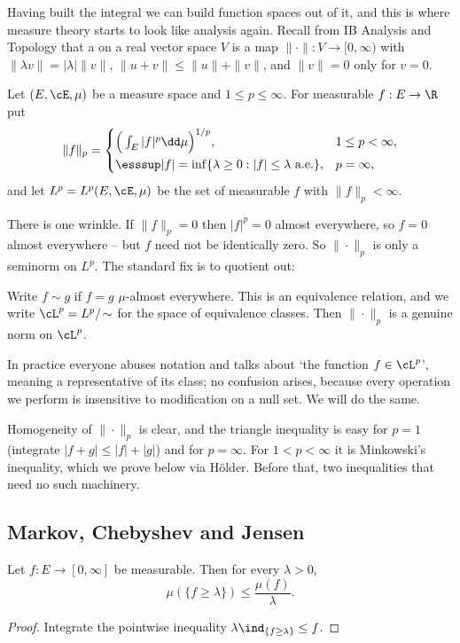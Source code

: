 Having built the integral we can build function spaces out of it, and this is where measure theory starts to look like analysis again. Recall from IB Analysis and Topology that a  on a real vector space $V$ is a map $\|\cdot\| : V \to [0,\infty)$ with $\|\lambda v\| = |\lambda|\|v\|$, $\|u+v\|\leq\|u\|+\|v\|$, and $\|v\|=0$ only for $v=0$.

\begin{definition}[$L^p$ spaces]
	Let $(E,\cE,\mu)$ be a measure space and $1 \leq p \leq \infty$. For measurable $f : E \to \R$ put
	$$
	\|f\|_p = \begin{cases}
		\Big( \int_E |f|^p \dd\mu\Big)^{1/p}, & 1 \leq p < \infty,\\[4pt]
		\esssup |f| = \inf\{\lambda \geq 0 : |f| \leq \lambda \text{ a.e.}\}, & p = \infty,
	\end{cases}
	$$
	and let $L^p = L^p(E,\cE,\mu)$ be the set of measurable $f$ with $\|f\|_p < \infty$.
\end{definition}

There is one wrinkle. If $\|f\|_p = 0$ then $|f|^p = 0$ almost everywhere, so $f = 0$ almost everywhere -- but $f$ need not be identically zero. So $\|\cdot\|_p$ is only a seminorm on $L^p$. The standard fix is to quotient out:

\begin{definition}
	Write $f \sim g$ if $f = g$ $\mu$-almost everywhere. This is an equivalence relation, and we write $\cL^p = L^p/\!\sim$ for the space of equivalence classes. Then $\|\cdot\|_p$ is a genuine norm on $\cL^p$.
\end{definition}

In practice everyone abuses notation and talks about `the function $f \in \cL^p$', meaning a representative of its class; no confusion arises, because every operation we perform is insensitive to modification on a null set. We will do the same.

Homogeneity of $\|\cdot\|_p$ is clear, and the triangle inequality is easy for $p=1$ (integrate $|f+g|\leq|f|+|g|$) and for $p=\infty$. For $1<p<\infty$ it is Minkowski's inequality, which we prove below via H\"older. Before that, two inequalities that need no such machinery.

\subsection{Markov, Chebyshev and Jensen}

\begin{proposition}\label{prop:markov}
	Let $f : E \to[0,\infty]$ be measurable. Then for every $\lambda>0$,
	$$
	\mu(\{f \geq \lambda\}) \leq \frac{\mu(f)}{\lambda}.
	$$
\end{proposition}
\begin{proof}
	Integrate the pointwise inequality $\lambda\ind_{\{f\geq\lambda\}} \leq f$.
\end{proof}


